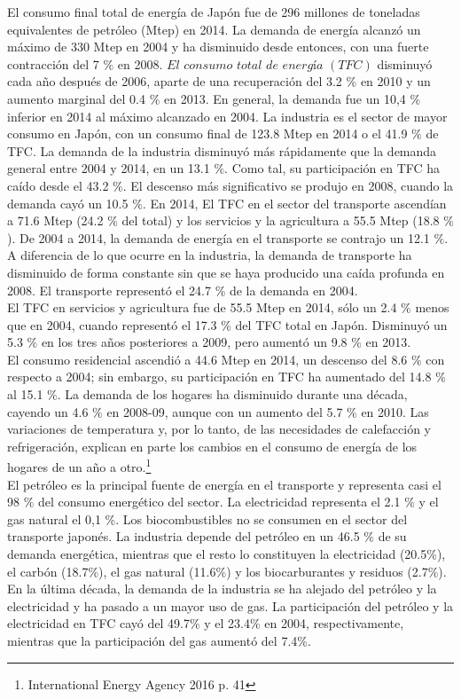 \documentclass[]{article}
\begin{document}
El consumo final total de energía de Japón fue de 296 millones de toneladas equivalentes de petróleo (Mtep) en 2014. La demanda de energía alcanzó un máximo de 330 Mtep en 2004 y ha disminuido desde entonces, con una fuerte contracción del 7 $\%$ en 2008. $El$ $consumo$ $total$ $de$ $energía$ $(TFC)$ disminuyó cada año después de 2006, aparte de una recuperación del 3.2 $\%$ en 2010 y un aumento marginal del 0.4 $\%$ en 2013. En general, la demanda fue un 10,4 $\%$ inferior en 2014 al máximo alcanzado en 2004. La industria es el sector de mayor consumo en Japón, con un consumo final de 123.8 Mtep en 2014 o el 41.9 $\%$ de TFC. La demanda de la industria disminuyó más rápidamente que la demanda general entre 2004 y 2014, en un 13.1 $\%$. Como tal, su participación en TFC ha caído desde el 43.2 $\%$. El descenso más significativo se produjo en 2008, cuando la demanda cayó un 10.5 $\%$. En 2014, El TFC en el sector del transporte ascendían a 71.6 Mtep (24.2 $\%$ del total) y los servicios y la agricultura a 55.5 Mtep (18.8 $\%$). De 2004 a 2014, la demanda de energía en el transporte se contrajo un 12.1 $\%$. A diferencia de lo que ocurre en la industria, la demanda de transporte ha disminuido de forma constante sin que se haya producido una caída profunda en 2008. El transporte representó el 24.7 $\%$ de la demanda en 2004.\\

El TFC en servicios y agricultura fue de 55.5 Mtep en 2014, sólo un 2.4 $\%$ menos que en 2004, cuando representó el 17.3 $\%$ del TFC total en Japón. Disminuyó un 5.3 $\%$ en los tres años posteriores a 2009, pero aumentó un 9.8 $\%$ en 2013.\\

El consumo residencial ascendió a 44.6 Mtep en 2014, un descenso del 8.6 $\%$ con respecto a 2004; sin embargo, su participación en TFC ha aumentado del 14.8 $\%$ al 15.1 $\%$. La demanda de los hogares ha disminuido durante una década, cayendo un 4.6 $\%$ en 2008-09, aunque con un aumento del 5.7 $\%$ en 2010. Las variaciones de temperatura y, por lo tanto, de las necesidades de calefacción y refrigeración, explican en parte los cambios en el consumo de energía de los hogares de un año a otro.\citep{InternationalEnergyAgency2016}\footnote{International Energy Agency 2016 p. 41}\\


El petróleo es la principal fuente de energía en el transporte y representa casi el 98 $\%$ del consumo energético del sector. La electricidad representa el 2.1 $\%$ y el gas natural el 0,1 $\%$. Los biocombustibles no se consumen en el sector del transporte japonés.
La industria depende del petróleo en un 46.5 $\%$ de su demanda energética, mientras que el resto lo constituyen la electricidad (20.5$\%$), el carbón (18.7$\%$), el gas natural (11.6$\%$) y los biocarburantes y residuos (2.7$\%$). En la última década, la demanda de la industria se ha alejado del petróleo y la electricidad y ha pasado a un mayor uso de gas. La participación del petróleo y la electricidad en TFC cayó del 49.7$\%$ y el 23.4$\%$ en 2004, respectivamente, mientras que la participación del gas aumentó del 7.4$\%$.\\
\end{document}

